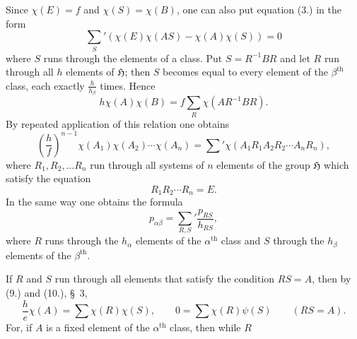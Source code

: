 \documentclass[11pt]{article}
\newcommand{\grp}{\mathfrak{H}}
\begin{document}
Since $\chi(E)=f$ and $\chi(S)=\chi(B)$, one can also put equation (3.) in the form
\begin{equation*}\tag{4.}
\sum_S'\left(\chi(E)\chi(AS)-\chi(A)\chi(S)\right)=0
\end{equation*}
where $S$ runs through the elements of a class. Put $S=R^{-1}BR$ and let $R$ run through all $h$ elements of $\grp$; then $S$ becomes equal to every element of the $\beta^{\text{th}}$ class, each exactly $\frac{h}{h_\beta}$ times. Hence
\begin{equation*}\tag{5.}
h\chi(A)\chi(B)=f\sum_R\chi(AR^{-1}BR).
\end{equation*}
By repeated application of this relation one obtains
\begin{equation*}\tag{6.}
\left(\frac{h}{f}\right)^{n-1}\chi(A_1)\chi(A_2)\cdots\chi(A_n)=\sum'\chi(A_1R_1A_2R_2\cdots A_nR_n),
\end{equation*}
where $R_1,R_2,\ldots R_n$ run through all systems of $n$ elements of the group $\grp$ which satisfy the equation
\[
R_1R_2\cdots R_n=E.
\]
In the same way one obtains the formula
\begin{equation*}\tag{7.}
p_{\alpha\beta}=\sum_{R,S}'\frac{p_{RS}}{h_{RS}},
\end{equation*}
where $R$ runs through the $h_\alpha$ elements of the $\alpha^{\text{th}}$ class and $S$ through the $h_\beta$ elements of the $\beta^{\text{th}}$.

If $R$ and $S$ run through all elements that satisfy the condition $RS=A$, then by (9.) and (10.), \S~3,
\begin{equation*}\tag{8.}
\frac{h}{e}\chi(A)=\sum\chi(R)\chi(S),\qquad 0=\sum\chi(R)\psi(S)\qquad(RS=A).
\end{equation*}
For, if $A$ is a fixed element of the $\alpha^{\text{th}}$ class, then while $R$
\end{document}
